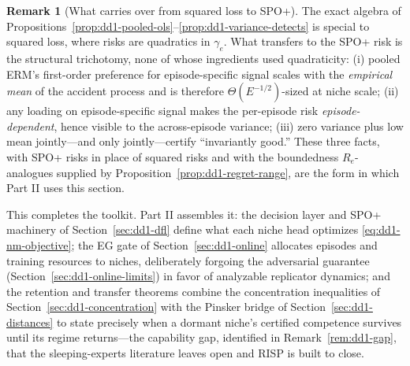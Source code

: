 \documentclass[11pt,a4paper]{article}
\theoremstyle{definition}
\newtheorem{remark}{Remark}[section]
\theoremstyle{plain}
\newcommand{\R}{\mathbb{R}}
\newcommand{\E}{\mathbb{E}}
\newcommand{\Var}{\mathrm{Var}}
\newcommand{\KL}{\mathrm{KL}}
\newcommand{\TV}{\mathrm{TV}}
\newcommand{\nm}{\textsc{RISP}}
\newcommand{\argmax}{\operatornamewithlimits{arg\,max}}
\newcommand{\argmin}{\operatornamewithlimits{arg\,min}}
\begin{document}
\begin{remark}[What carries over from squared loss to SPO+]
\label{rem:dd1-carryover}
The exact algebra of
Propositions~\ref{prop:dd1-pooled-ols}--\ref{prop:dd1-variance-detects} is
special to squared loss, where risks are quadratics in $\gamma_e$. What
transfers to the SPO+ risk is the structural trichotomy, none of whose
ingredients used quadraticity: (i) pooled ERM's first-order preference for
episode-specific signal scales with the \emph{empirical mean} of the
accident process and is therefore $\Theta(E^{-1/2})$-sized at niche scale;
(ii) any loading on episode-specific signal makes the per-episode risk
\emph{episode-dependent}, hence visible to the across-episode variance;
(iii) zero variance plus low mean jointly---and only jointly---certify
``invariantly good.'' These three facts, with SPO+ risks in place of squared
risks and with the boundedness $R_e$-analogues supplied by
Proposition~\ref{prop:dd1-regret-range}, are the form in which Part II uses
this section.
\end{remark}

This completes the toolkit. Part II assembles it: the decision layer and
SPO+ machinery of Section~\ref{sec:dd1-dfl} define what each niche head
optimizes \eqref{eq:dd1-nm-objective}; the EG gate of
Section~\ref{sec:dd1-online} allocates episodes and training resources to
niches, deliberately forgoing the adversarial guarantee
(Section~\ref{sec:dd1-online-limits}) in favor of analyzable replicator
dynamics; and the retention and transfer theorems combine the concentration
inequalities of Section~\ref{sec:dd1-concentration} with the Pinsker bridge
of Section~\ref{sec:dd1-distances} to state precisely when a dormant niche's
certified competence survives until its regime returns---the capability gap,
identified in Remark~\ref{rem:dd1-gap}, that the sleeping-experts literature
leaves open and \nm{} is built to close.

\end{document}
